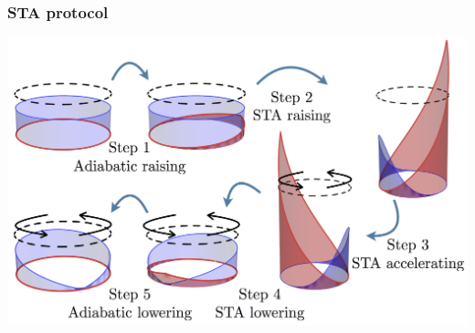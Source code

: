 \documentclass{beamer}
\begin{document}
\begin{frame}
\frametitle{STA protocol}
\includegraphics[width=\textwidth]{../data/1d/STAscheme.png}
\end{frame}
\end{document}
